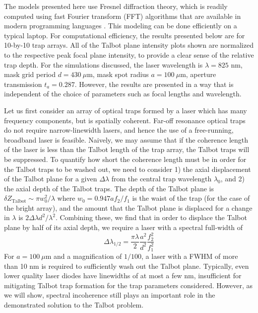 The models presented here use Fresnel diffraction theory, which is readily computed using fast Fourier transform (FFT) algorithms that are available in modern programming languages \cite{kelly2014}. This modeling can be done efficiently on a typical laptop. For computational efficiency, the results presented below are for 10-by-10 trap arrays. All of the Talbot plane intensity plots shown are normalized to the respective peak focal plane intensity, to provide a clear sense of the relative trap depth. For the simulations discussed, the laser wavelength is $\lambda =825 $ nm, mask grid period $d=430~ \mu$m, mask spot radius $a=100~\mu$m, aperture transmission $t_a=0.287$. However, the results are presented in a way that is independent of the choice of parameters such as focal lengths and wavelength.

Let us first consider an array of optical traps formed by a laser which has many frequency components, but is spatially coherent. Far-off resonance optical traps do not require narrow-linewidth lasers, and hence the use of a free-running, broadband laser is feasible. Naively, we may assume that if the coherence length of the laser is less than the Talbot length of the trap array, the Talbot traps will be suppressed. To quantify how short the coherence length must be in order for the Talbot traps to be washed out, we need to consider 1) the axial displacement of the Talbot plane for a given $\Delta \lambda$ from the central trap wavelength $\lambda_0$, and 2) the axial depth of the Talbot traps. The depth of the Talbot plane is $\delta Z_{\textrm{Talbot}} \sim \pi w_0^2/\lambda$ where $w_0=0.947af_2/f_1$ is the waist of the trap (for the case of the bright array), and the amount that the Talbot plane is displaced for a change in $\lambda$ is $2 \Delta \lambda d^2/\lambda^2$. Combining these, we find that in order to displace the Talbot plane by half of its axial depth, we require a laser with a spectral full-width of 
\begin{equation}
    \Delta \lambda_{1/2} = \frac{\pi \lambda}{2} \frac{a^2}{d^2} \frac{f_2^2}{f_1^2}
\end{equation}
For $a=100~\mu$m and a magnification of $1/100$, a laser with a FWHM of more than 10 nm is required to sufficiently wash out the Talbot plane. Typically, even lower quality laser diodes have linewidths of at most a few nm, insufficient for mitigating Talbot trap formation for the trap parameters considered. However, as we will show, spectral incoherence still plays an important role in the demonstrated solution to the Talbot problem.

